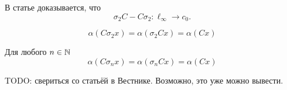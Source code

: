 В статье \cite[lemma 16]{Semenov2010invariant} доказывается, что
\begin{equation}
	\sigma_2 C - C \sigma_2 : \ell_\infty \to c_0
	.
\end{equation}

\begin{corollary}
	$$
		\alpha(C\sigma_2 x) =
		\alpha(\sigma_2 Cx) =
		\alpha(Cx)
	$$
\end{corollary}

\begin{hypothesis}
	Для любого $n\in\mathbb{N}$
	$$
		\alpha(C\sigma_n x) =
		\alpha(\sigma_n Cx) =
		\alpha(Cx)
	$$
\end{hypothesis}

TODO: свериться со статьёй в Вестнике. Возможно, это уже можно вывести.
